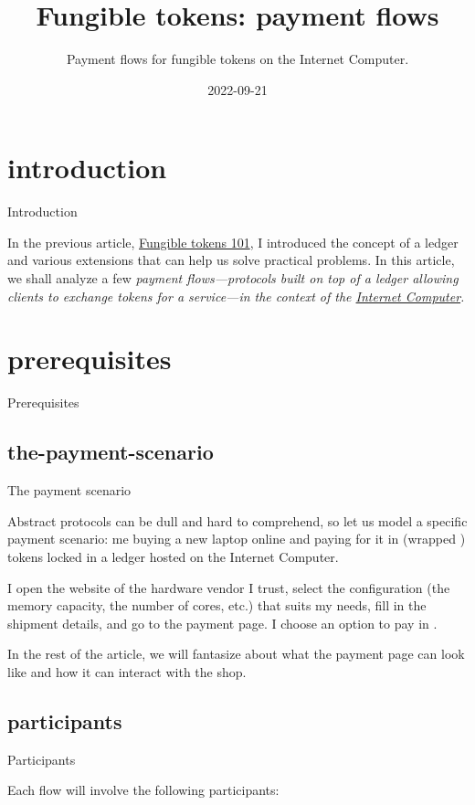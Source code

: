 \documentclass{article}
\title{Fungible tokens: payment flows}
\subtitle{Payment flows for fungible tokens on the Internet Computer.}
\date{2022-09-21}
\begin{document}
\section{introduction}{Introduction}

In the previous article, \href{/posts/09-fungible-tokens-101.html}{Fungible tokens 101}, I introduced the concept of a ledger and various extensions that can help us solve practical problems.
In this article, we shall analyze a few \em{payment flows}---protocols built on top of a ledger allowing clients to exchange tokens for a service---in the context of the \href{https://internetcomputer.org}{Internet Computer}.

\section{prerequisites}{Prerequisites}
\subsection{the-payment-scenario}{The payment scenario}

Abstract protocols can be dull and hard to comprehend, so let us model a specific payment scenario: me buying a new laptop online and paying for it in  (wrapped \href{https://en.wikipedia.org/wiki/Special_drawing_rights}{}) tokens locked in a ledger hosted on the Internet Computer.

I open the website of the hardware vendor I trust, select the configuration (the memory capacity, the number of cores, etc.) that suits my needs, fill in the shipment details, and go to the payment page.
I choose an option to pay in .

In the rest of the article, we will fantasize about what the payment page can look like and how it can interact with the shop.

\subsection{participants}{Participants}

Each flow will involve the following participants:
\end{document}
